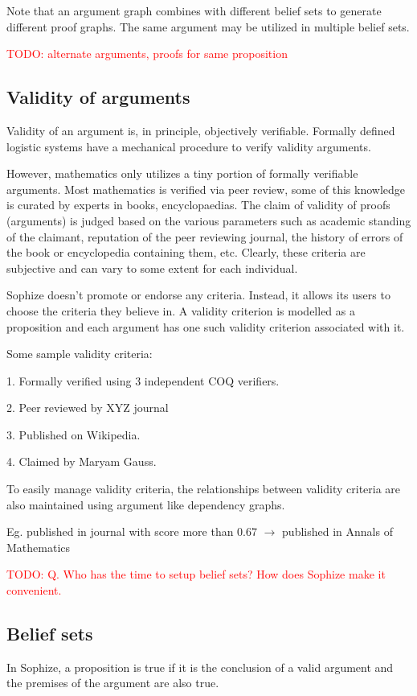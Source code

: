 \documentclass[a4paper]{article}
\newcommand\todo[1]{\textcolor{red}{TODO: #1}}
\begin{document}
Note that an argument graph combines with different belief sets to generate different proof graphs. The same argument may be utilized in multiple belief sets.

\todo{alternate arguments, proofs for same proposition}

\subsection{Validity of arguments}
Validity of an argument is, in principle, objectively verifiable. Formally defined logistic systems have a mechanical procedure to verify validity arguments.

However, mathematics only utilizes a tiny portion of formally verifiable arguments. Most mathematics is verified via peer review, some of this knowledge is curated by experts in books, encyclopaedias. The claim of validity of proofs (arguments) is judged based on the various parameters such as academic standing of the claimant, reputation of the peer reviewing journal, the history of errors of the book or encyclopedia containing them, etc. Clearly, these criteria are subjective and can vary to some extent for each individual.

Sophize doesn't promote or endorse any criteria. Instead, it allows its users to choose the criteria they believe in. A validity criterion is modelled as a proposition and each argument has one such validity criterion associated with it.

Some sample validity criteria:

1. Formally verified using 3 independent COQ verifiers.

2. Peer reviewed by XYZ journal

3. Published on Wikipedia.

4. Claimed by Maryam Gauss.

To easily manage validity criteria, the relationships between validity criteria are also maintained using argument like dependency graphs.

Eg. published in journal with score more than 0.67 $\rightarrow$ published in Annals of Mathematics


\todo{Q. Who has the time to setup belief sets? How does Sophize make it 
convenient.}


\subsection{Belief sets}

In Sophize, a proposition is true if it is the conclusion of a valid argument and the premises of the argument are also true.
\end{document}
